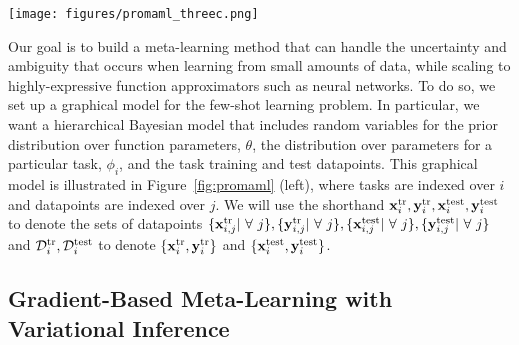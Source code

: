 \documentclass{article}
\begin{document}
\iffalse
\begingroup
\setlength{\columnsep}{0.1cm}\begin{wrapfigure}{R}{0.6\columnwidth}
    \vspace{-0.4cm}
    \texttt{[image: figures/promaml\_both\_v2.png]}
    \vspace{-0.4cm}
    \caption{\label{fig:promaml} .}
\end{wrapfigure}
\begingroup
\fi


\begin{figure*}[t] \centering
    \texttt{[image: figures/promaml\_threec.png]}
    \vspace{-0.3cm}
    \caption{\label{fig:promaml} \small Graphical models corresponding to our approach. The original graphical model (left) is transformed into the center model after performing inference over $\phi_i$. We find it beneficial to introduce additional dependencies of the prior on the training data to compensate for using the MAP estimate to approximate $p(\phi_i)$, as shown on the right.}
    \vspace{-0.2cm}
\end{figure*}
Our goal is to build a meta-learning method that can handle the uncertainty and ambiguity that occurs when learning from small amounts of data, while scaling to highly-expressive function approximators such as neural networks. To do so, we set up a graphical model for the few-shot learning problem. In particular, we want a hierarchical Bayesian model that includes random variables for the prior distribution over function parameters, $\theta$, the distribution over parameters for a particular task, $\phi_i$, and the task training and test datapoints.  This graphical model is illustrated in Figure~\ref{fig:promaml} (left), where tasks are indexed over $i$ and datapoints are indexed over $j$.
We will use the shorthand $\mathbf{x}^{\text{tr}}_i, \mathbf{y}^{\text{tr}}_i, \mathbf{x}^{\text{test}}_i, \mathbf{y}^{\text{test}}_i$ to denote the sets of datapoints $\{\mathbf{x}^{\text{tr}}_{i,j} | ~\forall~ j\}, \{\mathbf{y}^{\text{tr}}_{i,j} | ~\forall~ j\},\{\mathbf{x}^{\text{test}}_{i,j} | ~\forall~ j\}, \{\mathbf{y}^{\text{test}}_{i,j} | ~\forall~ j\}$ and $\mathcal{D}^\text{tr}_i, \mathcal{D}^\text{test}_i$ to denote $\{\mathbf{x}^{\text{tr}}_i, \mathbf{y}^{\text{tr}}_i\}$ and $\{\mathbf{x}^{\text{test}}_i, \mathbf{y}^{\text{test}}_i\}$.


\vspace{-0.2cm}
\subsection{Gradient-Based Meta-Learning with Variational Inference}
\vspace{-0.2cm}
\end{document}
